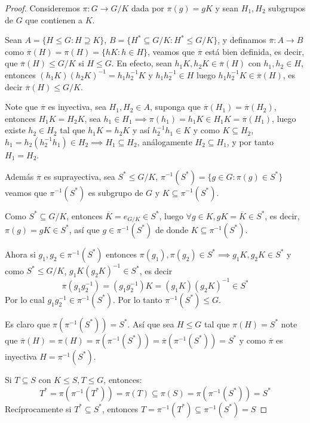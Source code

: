 \begin{proof}
	Consideremos $\pi: G \to G/K$ dada por $\pi(g) = gK$ y sean $H_1, H_2$ subgrupos de $G$ que contienen a $K$.

	Sean $A = \{ H \le G : H \supseteq K \}$, $B = \{ H^* \subseteq G/K : H^* \le G/K \}$, y definamos $\overline{\pi}: A \to B$ como $\overline{\pi}(H) = \pi(H) = \{ hK : h \in H \}$, veamos que $\overline{\pi}$ está bien definida, es decir, que $\overline{\pi}(H) \le G/K$ si $H \le G$.
	En efecto, sean $h_1 K, h_2 K \in \overline{\pi}(H)$ con $h_1, h_2 \in H$, entonces $(h_1 K)(h_2 K)^{-1} = h_1 h_2^{-1} K$ y $h_1 h_2^{-1} \in H$ luego $h_1 h_2^{-1} K \in \overline{\pi}(H)$, es decir $\overline{\pi}(H) \le G/K$.

	Note que $\overline{\pi}$ es inyectiva, sea $H_1, H_2 \in A$, suponga que $\overline{\pi}(H_1) = \overline{\pi}(H_2)$, entonces $H_1 K = H_2 K$, sea $h_1 \in H_1 \implies \pi(h_1) = h_1 K \in H_1 K = \overline{\pi}(H_1)$, luego existe $h_2 \in H_2$ tal que $h_1 K = h_2 K$ y así $h_2^{-1}h_1 \in K$ y como $K \subseteq H_2$, $h_1 = h_2(h_2^{-1}h_1) \in H_2 \implies H_1 \subseteq H_2$, análogamente $H_2 \subseteq H_1$, y por tanto $H_1 = H_2$.

	Además $\overline{\pi}$ es suprayectiva, sea $S^* \le G/K$, $\pi^{-1}(S^*) = \{ g \in G : \pi(g) \in S^* \}$ veamos que $\pi^{-1}(S^*)$ es subgrupo de $G$ y $K \subseteq \pi^{-1}(S^*)$.

	Como $S^* \subseteq G/K$, entonces $\overline{K} = e_{G/K} \in S^*$, luego $\forall g \in K, gK = \overline{K} \in S^*$, es decir, $\pi(g) = gK \in S^*$, así que $g \in \pi^{-1}(S^*)$ de donde $K \subseteq \pi^{-1}(S^*)$.

	Ahora si $g_1, g_2 \in \pi^{-1}(S^*)$ entonces $\pi(g_1), \pi(g_2) \in S^* \implies g_1 K, g_2 K \in S^*$ y como $S^* \le G/K$, $g_1 K (g_2 K)^{-1} \in S^*$, es decir
	\begin{equation*}
		\pi(g_1 g_2^{-1}) = (g_1 g_2^{-1})K = (g_1 K)(g_2 K)^{-1} \in S^*
	\end{equation*}
	Por lo cual $g_1 g_2^{-1} \in \pi^{-1}(S^*)$. Por lo tanto $\pi^{-1}(S^*) \le G$.

	Es claro que $\pi(\pi^{-1}(S^*)) = S^*$. Así que sea $H \le G$ tal que $\pi(H) = S^*$ note que $\overline{\pi}(H) = \pi(H) = \pi(\pi^{-1}(S^*)) = \overline{\pi}(\pi^{-1}(S^*)) = S^*$ y como $\overline{\pi}$ es inyectiva $H = \pi^{-1}(S^*)$.

	Si $T \subseteq S$ con $K \le S, T \le G$, entonces:
	\begin{equation*}
		T^* = \pi(\pi^{-1}(T^*)) = \pi(T) \subseteq \pi(S) = \pi(\pi^{-1}(S^*)) = S^*
	\end{equation*}
	Recíprocamente si $T^* \subseteq S^*$, entonces $T = \pi^{-1}(T^*) \subseteq \pi^{-1}(S^*) = S$


\end{proof}
